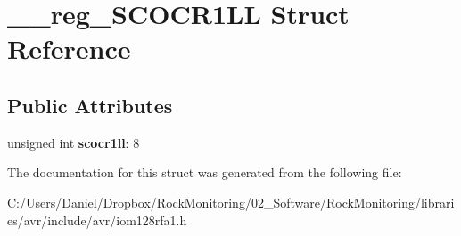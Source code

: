 \hypertarget{struct____reg___s_c_o_c_r1_l_l}{}\section{\+\_\+\+\_\+reg\+\_\+\+S\+C\+O\+C\+R1\+LL Struct Reference}
\label{struct____reg___s_c_o_c_r1_l_l}
\subsection*{Public Attributes}
\begin{DoxyCompactItemize}
\item 
unsigned int {\bfseries scocr1ll}\+: 8\hypertarget{struct____reg___s_c_o_c_r1_l_l_ad7c3b5980173f0c596df17de432a809e}{}\label{struct____reg___s_c_o_c_r1_l_l_ad7c3b5980173f0c596df17de432a809e}

\end{DoxyCompactItemize}


The documentation for this struct was generated from the following file\+:\begin{DoxyCompactItemize}
\item 
C\+:/\+Users/\+Daniel/\+Dropbox/\+Rock\+Monitoring/02\+\_\+\+Software/\+Rock\+Monitoring/libraries/avr/include/avr/iom128rfa1.\+h\end{DoxyCompactItemize}
